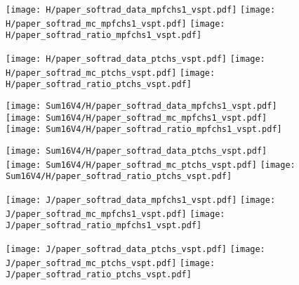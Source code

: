 \documentclass[landscape,10pt]{beamer} %
\begin{document}
\newpage

\begin{figure}[p]
\centering
  \texttt{[image: H/paper\_softrad\_data\_mpfchs1\_vspt.pdf]}
  \texttt{[image: H/paper\_softrad\_mc\_mpfchs1\_vspt.pdf]}
  \texttt{[image: H/paper\_softrad\_ratio\_mpfchs1\_vspt.pdf]}
\end{figure}

\begin{figure}[p]
\centering
  \texttt{[image: H/paper\_softrad\_data\_ptchs\_vspt.pdf]}
  \texttt{[image: H/paper\_softrad\_mc\_ptchs\_vspt.pdf]}
  \texttt{[image: H/paper\_softrad\_ratio\_ptchs\_vspt.pdf]}
\end{figure}

\newpage

\begin{figure}[p]
\centering
  \texttt{[image: Sum16V4/H/paper\_softrad\_data\_mpfchs1\_vspt.pdf]}
  \texttt{[image: Sum16V4/H/paper\_softrad\_mc\_mpfchs1\_vspt.pdf]}
  \texttt{[image: Sum16V4/H/paper\_softrad\_ratio\_mpfchs1\_vspt.pdf]}
\end{figure}

\begin{figure}[p]
\centering
  \texttt{[image: Sum16V4/H/paper\_softrad\_data\_ptchs\_vspt.pdf]}
  \texttt{[image: Sum16V4/H/paper\_softrad\_mc\_ptchs\_vspt.pdf]}
  \texttt{[image: Sum16V4/H/paper\_softrad\_ratio\_ptchs\_vspt.pdf]}
\end{figure}

\newpage

\begin{figure}[p]
\centering
  \texttt{[image: J/paper\_softrad\_data\_mpfchs1\_vspt.pdf]}
  \texttt{[image: J/paper\_softrad\_mc\_mpfchs1\_vspt.pdf]}
  \texttt{[image: J/paper\_softrad\_ratio\_mpfchs1\_vspt.pdf]}
\end{figure}

\begin{figure}[p]
\centering
  \texttt{[image: J/paper\_softrad\_data\_ptchs\_vspt.pdf]}
  \texttt{[image: J/paper\_softrad\_mc\_ptchs\_vspt.pdf]}
  \texttt{[image: J/paper\_softrad\_ratio\_ptchs\_vspt.pdf]}
\end{figure}

\newpage
\end{document}

